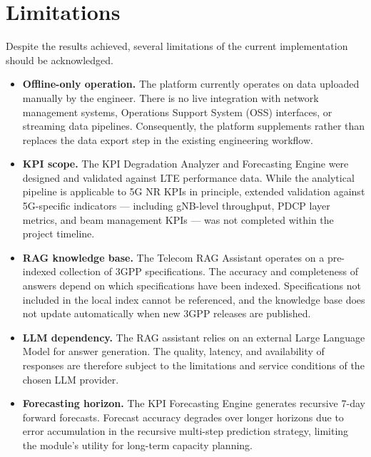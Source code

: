 \section{Limitations}

Despite the results achieved, several limitations of the current implementation should be acknowledged.

\begin{itemize}

    \item \textbf{Offline-only operation.} The platform currently operates on data uploaded manually by the engineer. There is no live integration with network management systems, Operations Support System (OSS) interfaces, or streaming data pipelines. Consequently, the platform supplements rather than replaces the data export step in the existing engineering workflow.

    \item \textbf{KPI scope.} The KPI Degradation Analyzer and Forecasting Engine were designed and validated against LTE performance data. While the analytical pipeline is applicable to 5G NR KPIs in principle, extended validation against 5G-specific indicators — including gNB-level throughput, PDCP layer metrics, and beam management KPIs — was not completed within the project timeline.

    \item \textbf{RAG knowledge base.} The Telecom RAG Assistant operates on a pre-indexed collection of 3GPP specifications. The accuracy and completeness of answers depend on which specifications have been indexed. Specifications not included in the local index cannot be referenced, and the knowledge base does not update automatically when new 3GPP releases are published.

    \item \textbf{LLM dependency.} The RAG assistant relies on an external Large Language Model for answer generation. The quality, latency, and availability of responses are therefore subject to the limitations and service conditions of the chosen LLM provider.

    \item \textbf{Forecasting horizon.} The KPI Forecasting Engine generates recursive 7-day forward forecasts. Forecast accuracy degrades over longer horizons due to error accumulation in the recursive multi-step prediction strategy, limiting the module's utility for long-term capacity planning.

\end{itemize}

